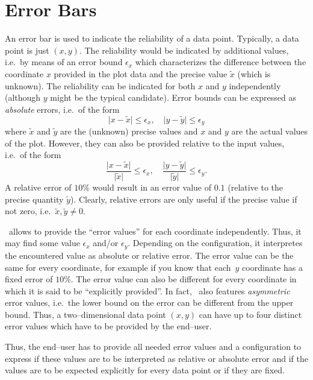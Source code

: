 
\section{Error Bars}
\label{sec:errorbars}
{%
\def\pgfplotserror#1{\ensuremath{\epsilon_{#1}}}%

An error bar is used to indicate the reliability of a data point. Typically, a data point is just $(x,y)$. The reliability would be indicated by additional values, i.e.\ by means of an error bound $\pgfplotserror{x}$ which characterizes the difference between the coordinate $x$ provided in the plot data and the precise value $\tilde x$ (which is unknown). The reliability can be indicated for both $x$ and $y$ independently (although $y$ might be the typical candidate). Error bounds can be expressed as \emph{absolute} errors, i.e.\ of the form
\[ \lvert{x- \tilde x}\rvert \le \pgfplotserror{x}, \quad \lvert{y-\tilde y}\rvert \le \pgfplotserror{y} \]
where $\tilde x$ and $\tilde y$ are the (unknown) precise values and $x$ and $y$ are the actual values of the plot. However, they can also be provided relative to the input values, i.e.\ of the form
\[ \frac{\lvert{x-\tilde x}\rvert} {\lvert\tilde x\rvert} \le \pgfplotserror{x}, \quad \frac{\lvert{y-\tilde y}\rvert} {\lvert\tilde y\rvert} \le \pgfplotserror{y}.\]
A relative error of $10\%$ would result in an error value of $0.1$ (relative to the precise quantity $\tilde y$). Clearly, relative errors are only useful if the precise value if not zero, i.e.\ $\tilde x, \tilde y \neq 0$. 

\PGFPlots\ allows to provide the ``error values'' for each coordinate independently. Thus, it may find some value $\pgfplotserror{x}$ and/or $\pgfplotserror{y}$. Depending on the configuration, it interpretes the encountered value as absolute or relative error. The error value can be the same for every coordinate, for example if you know that each~$y$ coordinate has a fixed error of $10\%$. The error value can also be different for every coordinate in which it is said to be ``explicitly provided''. In fact, \PGFPlots\ also features \emph{asymmetric} error values, i.e.\ the lower bound on the error can be different from the upper bound. Thus, a two--dimensional data point $(x,y)$ can have up to four distinct error values which have to be provided by the end--user.

Thus, the end--user has to provide all needed error values and a configuration to express if these values are to be interpreted as relative or absolute error and if the values are to be expected explicitly for every data point or if they are fixed. 

}
